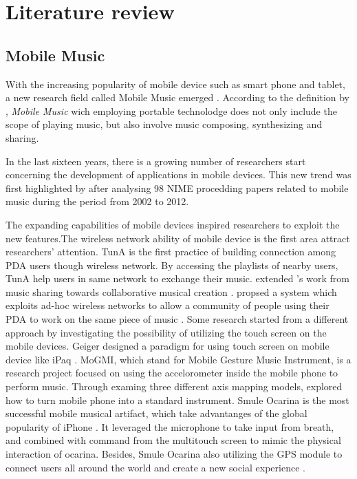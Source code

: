 \chapter{Literature review}
\label{ch: chapter 2}

\section{Mobile Music}

With the increasing popularity of mobile device such as smart phone and tablet, a new research field called Mobile Music emerged \citep{Reference4}. According to the definition by \citeauthor{Reference6}, \textit{Mobile Music} wich employing portable technolodge does not only include the scope of playing music, but also involve music composing, synthesizing and sharing\citep{Reference6}.

In the last sixteen years, there is a growing number of researchers start concerning the development of applications in mobile devices. This new trend was first highlighted by \citeauthor{Reference12} after analysing 98 NIME procedding papers related to mobile music during the period from 2002 to 2012\citep{Reference12}.

The expanding capabilities of mobile devices inspired researchers to exploit the new features.The wireless network ability of mobile device is the first area attract researchers' attention. TunA is the first practice of building connection among PDA users though wireless network\citep{Reference7}. By accessing the playlists of nearby users, TunA help users in same network to exchange their music. \citeauthor{Reference5} extended \citeauthor{Reference7}'s work from music sharing towards collaborative musical creation \citep{Reference5}. \citeauthor{Reference5} propsed a system which exploits ad-hoc wireless networks to allow a community of people using their PDA to work on the same piece of music \citep{Reference5}. Some research started from a different approach by investigating the possibility of utilizing the touch screen on the mobile devices. Geiger designed a paradigm for using touch screen on mobile device like iPaq \citep{Reference9, Reference10}.
MoGMI, which stand for Mobile Gesture Music Instrument, is a research project focused on using the accelorometer inside the mobile phone to perform music. Through examing three different axis mapping models, \citeauthor{Reference11} explored how to turn mobile phone into a standard instrument. Smule Ocarina is the most successful mobile musical artifact, which take advantanges of the global popularity of iPhone \citep{Reference8.1}. It leveraged the microphone to take input from breath, and combined with command from the multitouch screen to mimic the physical interaction of ocarina. Besides, Smule Ocarina also utilizing the GPS module to connect users all around the world and create a new social experience \citep{Reference8}.


